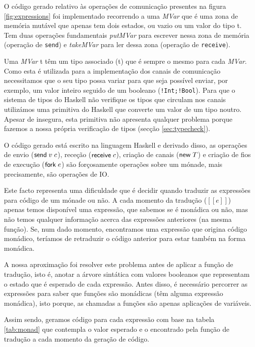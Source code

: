 O código gerado relativo às operações de comunicação presentes na figura \ref{fig:expressions} foi implementado recorrendo a uma \textit{MVar} que é uma zona de memória mutável que apenas tem dois estados, ou vazio ou um valor do tipo t. Tem duas operações fundamentais \textit{putMVar} para escrever nessa zona de memória (operação de \lstinline"send") e \textit{takeMVar} para ler dessa zona (operação de \lstinline"receive").

Uma \textit{MVar} t têm um tipo associado (t) que é sempre o mesmo para cada \textit{MVar}. Como esta é utilizada para a implementação dos canais de comunicação necessitamos que o seu tipo possa variar para que seja possível enviar, por exemplo, um valor inteiro seguido de um booleano (\lstinline"!Int;!Bool"). Para que o sistema de tipos do Haskell não verifique os tipos que circulam nos canais utilizámos uma primitiva do Haskell que converte um valor de um tipo noutro. Apesar de insegura, esta primitiva não apresenta qualquer problema porque fazemos a nossa própria verificação de tipos (secção \ref{sec:typecheck}).

O código gerado está escrito na linguagem Haskell e derivado disso, as operações de envio ($\mathsf{send}\;v\; c$), receção ($\mathsf{receive}\;c$), criação de canais ($\mathsf{new}\;T$) e criação de fios de execução ($\mathsf{fork}\;e$) são forçosamente operações sobre um mónade, mais precisamente, são operações de IO.

Este facto representa uma dificuldade que é decidir quando traduzir as expressões para código de um mónade ou não. A cada momento da tradução ($[\![e]\!]$) apenas temos disponível uma expressão, que sabemos se é monádica ou não, mas não temos qualquer informação acerca das expressões anteriores (na mesma função). Se, num dado momento, encontramos uma expressão que origina código monádico, teríamos de retraduzir o código anterior para estar também na forma monádica.

A nossa aproximação foi resolver este problema antes de aplicar a função de tradução, isto é, anotar a árvore sintática com valores booleanos que representam o estado que é esperado de cada expressão. Antes disso, é necessário percorrer as expressões para saber que funções são monádicas (têm alguma expressão monádica), isto porque, as chamadas a funções são apenas aplicações de variáveis.

Assim sendo, geramos código para cada expressão com base na tabela \ref{tab:monad} que contempla o valor esperado e o encontrado pela função de tradução a cada momento da geração de código.

